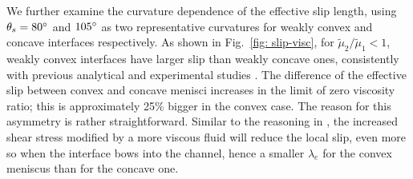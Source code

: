 We further examine the curvature dependence of the effective slip length, using $\theta_s = 80\degree$ and $105\degree$ as two representative curvatures for weakly convex and concave interfaces respectively.
As shown in Fig.\ \ref{fig: slip-visc},
for $\tilde{\mu}_2/\tilde{\mu}_1 < 1$, weakly convex interfaces have larger slip than weakly concave ones, consistently with previous analytical and experimental studies \cite{Davis_Lauga, Karatay}. 
The difference of the effective slip between convex and concave menisci increases in the limit of zero viscosity ratio; this is 
approximately 25\% bigger in the convex  case.
The reason for this asymmetry is rather straightforward. 
Similar to the reasoning in \cite{Sbragalia_Prosperetti}, the increased shear stress modified by a more viscous fluid will reduce the local slip, even more so when the interface bows into the channel, hence a smaller $\lambda_e$ for the convex meniscus than for the concave one.



